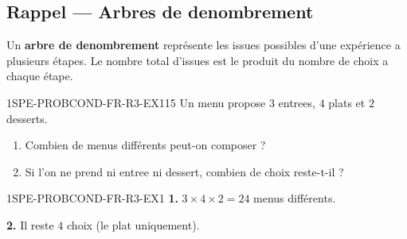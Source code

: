 

\subsection*{Rappel --- Arbres de denombrement}

Un \textbf{arbre de denombrement} représente les issues possibles d'une expérience a plusieurs étapes. Le nombre total d'issues est le produit du nombre de choix a chaque étape.

\begin{exercice}{1SPE-PROBCOND-FR-R3-EX1}{1}{5}
Un menu propose $3$ entrees, $4$ plats et $2$ desserts.
\begin{enumerate}
  \item Combien de menus différents peut-on composer ?
  \item Si l'on ne prend ni entree ni dessert, combien de choix reste-t-il ?
\end{enumerate}
\end{exercice}


\begin{corrige}{1SPE-PROBCOND-FR-R3-EX1}
\textbf{1.} $3 \times 4 \times 2 = 24$ menus différents.

\textbf{2.} Il reste $4$ choix (le plat uniquement).
\end{corrige}
